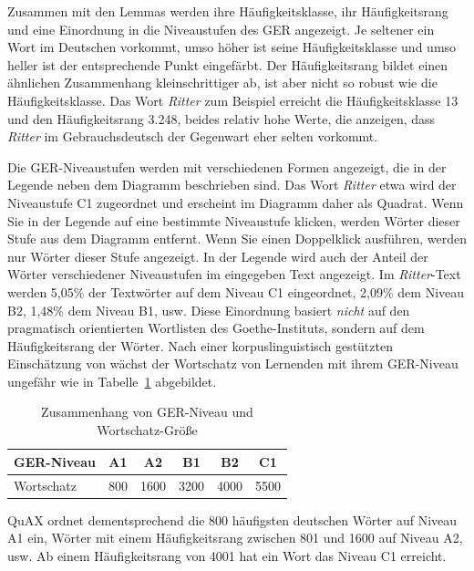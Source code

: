 \documentclass[11pt]{article}\usepackage[]{graphicx}\usepackage[]{color}
\begin{document}
Zusammen mit den Lemmas werden ihre Häufigkeitsklasse, ihr Häufigkeitsrang und eine Einordnung in die Niveaustufen des GER angezeigt. Je seltener ein Wort im Deutschen vorkommt, umso höher ist seine Häufigkeitsklasse und umso heller ist der entsprechende Punkt eingefärbt. Der Häufigkeitsrang bildet einen ähnlichen Zusammenhang kleinschrittiger ab, ist aber nicht so robust wie die Häufigkeitsklasse. Das Wort \textit{Ritter} zum Beispiel erreicht die Häufigkeitsklasse 13 und den Häufigkeitsrang 3.248, beides relativ hohe Werte, die anzeigen, dass \textit{Ritter} im Gebrauchsdeutsch der Gegenwart eher selten vorkommt. 

Die GER-Niveaustufen werden mit verschiedenen Formen angezeigt, die in der Legende neben dem Diagramm beschrieben sind. Das Wort \textit{Ritter} etwa wird der Niveaustufe C1 zugeordnet und erscheint im Diagramm daher als Quadrat. Wenn Sie in der Legende auf eine bestimmte Niveaustufe klicken, werden Wörter dieser Stufe aus dem Diagramm entfernt. Wenn Sie einen Doppelklick ausführen, werden nur Wörter dieser Stufe angezeigt. In der Legende wird auch der Anteil der Wörter verschiedener Niveaustufen im eingegeben Text angezeigt. Im \textit{Ritter}-Text werden 5,05\% der Textwörter auf dem Niveau C1 eingeordnet, 2,09\% dem Niveau B2, 1,48\% dem Niveau B1, usw. Diese Einordnung basiert \textit{nicht} auf den pragmatisch orientierten Wortlisten des Goethe-Instituts, sondern auf dem Häufigkeitsrang der Wörter. Nach einer korpuslinguistisch gestützten Einschätzung von \citet[101]{Tschirner.2019} wächst der Wortschatz von Lernenden mit ihrem GER-Niveau ungefähr wie in Tabelle~\ref{table:GER} abgebildet. 


\begin{table}[htbp]
\centering
\begin{threeparttable}
\caption{Zusammenhang von GER-Niveau und Wortschatz-Größe}
\label{table:GER}
\begin{tabular}{lccccc}
\toprule
GER-Niveau & A1 & A2 & B1 & B2 & C1 \\
\midrule
Wortschatz & 800 & 1600 & 3200 & 4000 & 5500 \\
\bottomrule
\end{tabular}
\end{threeparttable}
\end{table}

\noindent QuAX ordnet dementsprechend die 800 häufigsten deutschen Wörter auf Niveau A1 ein, Wörter mit einem Häufigkeitsrang zwischen 801 und 1600 auf Niveau A2, usw. Ab einem Häufigkeitsrang von 4001 hat ein Wort das Niveau C1 erreicht. 
\end{document}
